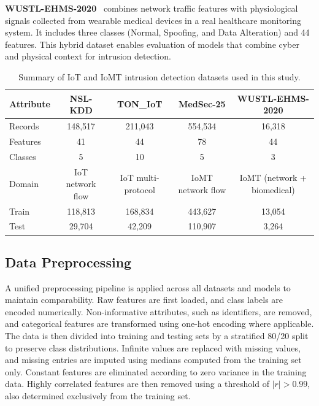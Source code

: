 \documentclass[journal,twoside,web]{ieeecolor}
\begin{document}
\textbf{WUSTL-EHMS-2020}~\cite{hady2020wustl} combines network traffic
features with physiological signals collected from wearable medical
devices in a real healthcare monitoring system. It includes three
classes (Normal, Spoofing, and Data Alteration) and 44 features. This hybrid
dataset enables evaluation of models that combine cyber and physical
context for intrusion detection.

\begin{table}[t]
\caption{Summary of IoT and IoMT intrusion detection datasets used in this study.}
\label{tab:datasets_transposed}
\centering
\renewcommand{\arraystretch}{1.2}
\small
\begin{tabular}{@{}lcccc@{}}
\toprule
\textbf{Attribute} & \textbf{NSL-KDD} & \textbf{TON\_IoT} & \textbf{MedSec-25} & \textbf{WUSTL-EHMS-2020} \\
\midrule
Records   & 148,517 & 211,043 & 554,534 & 16,318 \\
Features  & 41      & 44      & 78      & 44 \\
Classes   & 5       & 10      & 5       & 3 \\
Domain    & IoT network flow & IoT multi-protocol & IoMT network flow & IoMT (network + biomedical) \\
Train     & 118,813 & 168,834 & 443,627 & 13,054 \\
Test      & 29,704  & 42,209  & 110,907 & 3,264 \\
\bottomrule
\end{tabular}
\end{table}

\subsection{Data Preprocessing}
\label{sec:preprocessing}

A unified preprocessing pipeline is applied across all datasets and
models to maintain comparability. Raw features are first loaded, and
class labels are encoded numerically. Non-informative attributes, such
as identifiers, are removed, and categorical features are transformed
using one-hot encoding where applicable. The data is then divided into
training and testing sets by a stratified 80/20 split to preserve class
distributions. Infinite values are replaced with missing values, and
missing entries are imputed using medians computed from the training
set only. Constant features are eliminated according to zero variance in
the training data. Highly correlated features are then removed using a
threshold of $|r| > 0.99$, also determined exclusively from the
training set.
\end{document}
